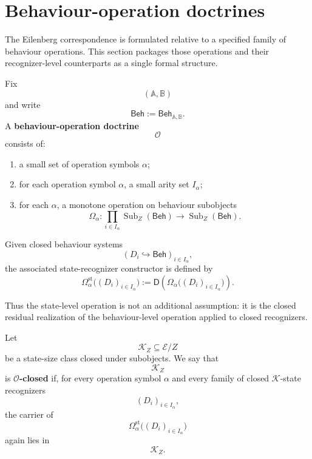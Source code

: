 \section{Behaviour-operation doctrines}
\label{sec:eilenberg-behaviour-operation-doctrines}

The Eilenberg correspondence is formulated relative to a specified family of
behaviour operations. This section packages those operations and their
recognizer-level counterparts as a single formal structure.

\begin{definition}
\label{def:eilenberg-behaviour-operation-doctrine}
Fix
\[
(\mathbb A,\mathbb B)
\]
and write
\[
\mathsf{Beh}:=\mathsf{Beh}_{\mathbb A,\mathbb B}.
\]
A \textbf{behaviour-operation doctrine}
\[
\mathcal O
\]
consists of:
\begin{enumerate}
\item a small set of operation symbols \(\alpha\);
\item for each operation symbol \(\alpha\), a small arity set \(I_\alpha\);
\item for each \(\alpha\), a monotone operation on behaviour subobjects
\[
\Omega_\alpha:
\prod_{i\in I_\alpha}
\operatorname{Sub}_Z(\mathsf{Beh})
\to
\operatorname{Sub}_Z(\mathsf{Beh}).
\]
\end{enumerate}
Given closed behaviour systems
\[
(D_i\hookrightarrow\mathsf{Beh})_{i\in I_\alpha},
\]
the associated state-recognizer constructor is defined by
\[
\Omega_\alpha^{\mathrm{st}}\bigl((D_i)_{i\in I_\alpha}\bigr)
:=
\mathsf D
\left(
\Omega_\alpha\bigl((D_i)_{i\in I_\alpha}\bigr)
\right).
\]
\end{definition}

Thus the state-level operation is not an additional assumption: it is the
closed residual realization of the behaviour-level operation applied to
closed recognizers.

\begin{definition}
\label{def:eilenberg-O-closed-state-size-class}
Let
\[
\mathcal K_Z\subseteq\mathcal E/Z
\]
be a state-size class closed under subobjects. We say that
\[
\mathcal K_Z
\]
is \textbf{\(\mathcal O\)-closed} if, for every operation symbol \(\alpha\)
and every family of closed \(\mathcal K\)-state recognizers
\[
(D_i)_{i\in I_\alpha},
\]
the carrier of
\[
\Omega_\alpha^{\mathrm{st}}\bigl((D_i)_{i\in I_\alpha}\bigr)
\]
again lies in
\[
\mathcal K_Z.
\]
\end{definition}

